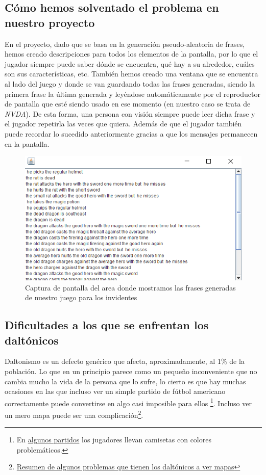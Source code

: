 \subsection{Cómo hemos solventado el problema en nuestro proyecto}

En el proyecto, dado que se basa en la generación pseudo-aleatoria de frases, hemos creado descripciones para todos los elementos de la pantalla, por lo que el jugador siempre puede saber dónde se encuentra, qué hay a su alrededor, cuáles son sus características, etc. También hemos creado una ventana que se encuentra al lado del juego y donde se van guardando todas las frases generadas, siendo la primera frase la última generada y leyéndose automáticamente por el reproductor de pantalla que esté siendo usado en ese momento (en nuestro caso se trata de \textit{NVDA}). De esta forma, una persona con visión siempre puede leer dicha frase y el jugador repetirla las veces que quiera. Además de que el jugador también puede recordar lo sucedido anteriormente gracias a que los mensajes permanecen en la pantalla.

\begin{figure}[H]
		\includegraphics[width=\textwidth,height=\textheight,keepaspectratio]{./img/roomsGameTextArea.png}
	\caption{Captura de pantalla del area donde mostramos las frases generadas de nuestro juego para los invidentes}
	\label{fig:roomsgametextarea}
\end{figure}

\subsection{Dificultades a los que se enfrentan los daltónicos}

Daltonismo es un defecto genérico que afecta, aproximadamente, al 1\% de la población. Lo que en un principio parece como un pequeño inconveniente que no cambia mucho la vida de la persona que lo sufre, lo cierto es que hay muchas ocasiones en las que incluso ver un simple partido de fútbol americano correctamente puede convertirse en algo casi imposible para ellos \footnote{En \href{http://goo.gl/o3GkrP}{algunos partidos} los jugadores llevan camisetas con colores problemáticos.}. Incluso ver un mero mapa puede ser una complicación\footnote{\href{https://i.imgur.com/CMCywUU.jpg}{Resumen de algunos problemas que tienen los daltónicos a ver mapas}}.


